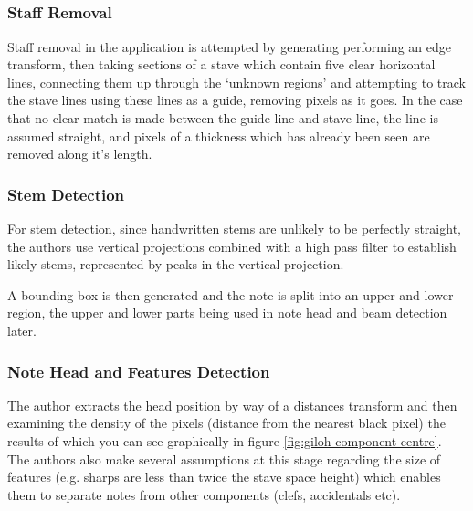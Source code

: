 \subsection{\cite{benoptical}}

\subsubsection{Staff Removal}

Staff removal in the application is attempted by generating performing an edge transform, then taking sections of a stave which contain five clear horizontal lines, connecting them up through the `unknown regions' and attempting to track the stave lines using these lines as a guide, removing pixels as it goes. In the case that no clear match is made between the guide line and stave line, the line is assumed straight, and pixels of a thickness which has already been seen are removed along it's length.

\subsubsection{Stem Detection}

For stem detection, since handwritten stems are unlikely to be perfectly straight, the authors use vertical projections combined with a high pass filter to establish likely stems, represented by peaks in the vertical projection.

A bounding box is then generated and the note is split into an upper and lower region, the upper and lower parts being used in note head and beam detection later.

\subsubsection{Note Head and Features Detection}

The author extracts the head position by way of a distances transform and then examining the density of the pixels (distance from the nearest black pixel) the results of which you can see graphically in figure \ref{fig:giloh-component-centre}. The authors also make several assumptions at this stage regarding the size of features (e.g. sharps are less than twice the stave space height) which enables them to separate notes from other components (clefs, accidentals etc).

